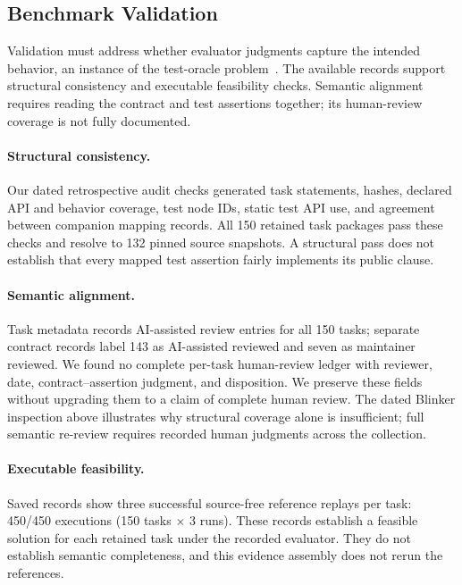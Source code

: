 \documentclass[acmsmall,screen,review,anonymous]{acmart}
\begin{document}
\subsection{Benchmark Validation}
\label{sec:validation}

Validation must address whether evaluator judgments capture the intended
behavior, an instance of the test-oracle problem~\cite{barr2015oracle}.
The available records support structural consistency and executable
feasibility checks. Semantic alignment requires reading the contract and test
assertions together; its human-review coverage is not fully documented.

\paragraph{Structural consistency.}
Our dated retrospective audit checks generated task statements, hashes,
declared API and behavior coverage, test node IDs, static test API use, and
agreement between companion mapping records. All 150 retained task packages
pass these checks and resolve to 132 pinned source snapshots. A structural
pass does not establish that every mapped test assertion fairly implements
its public clause.

\paragraph{Semantic alignment.}
Task metadata records AI-assisted review entries for all 150 tasks; separate
contract records label 143 as AI-assisted reviewed and seven as maintainer
reviewed. We found no complete per-task human-review ledger with reviewer,
date, contract--assertion judgment, and disposition. We preserve these fields
without upgrading them to a claim of complete human review. The dated Blinker
inspection above illustrates why structural coverage alone is insufficient;
full semantic re-review requires recorded human judgments across the collection.

\paragraph{Executable feasibility.}
Saved records show three successful source-free reference replays per task:
450/450 executions (150 tasks $\times$ 3 runs). These records establish a
feasible solution for each retained task under the recorded evaluator. They do
not establish semantic completeness, and this evidence assembly does not rerun
the references.
\end{document}
